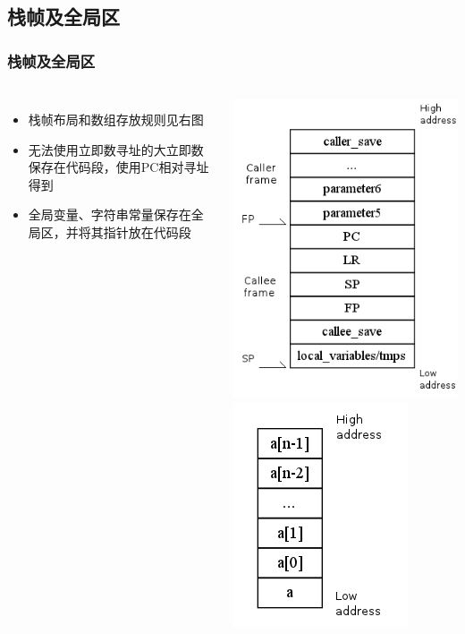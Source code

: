 \documentclass{beamer}
\begin{document}
\subsection{栈帧及全局区}
\begin{frame}
	\frametitle{栈帧及全局区}
	\begin{columns}
			\begin{itemize}
				\item 栈帧布局和数组存放规则见右图
				\item 无法使用立即数寻址的大立即数保存在代码段，使用PC相对寻址得到
				\item 全局变量、字符串常量保存在全局区，并将其指针放在代码段
				\end{itemize}
		\begin{columns}
			\includegraphics[scale=0.3]{stack_frame.png}
			\includegraphics[scale=0.3]{local_array.png}
		\end{columns}
	\end{columns}
\end{frame}
\end{document}
